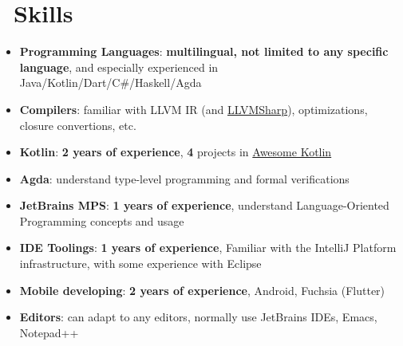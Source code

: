 \documentclass{resume}
\begin{document}
\section{\faCogs\ Skills}
\begin{itemize}[parsep=0.5ex]
  \item \textbf{Programming Languages}:
    \textbf{multilingual, not limited to any specific language},
    and especially experienced in Java/Kotlin/Dart/C\#/Haskell/Agda

  \item \textbf{Compilers}:
    familiar with LLVM IR (and \href{https://github.com/Microsoft/LLVMSharp/} {LLVMSharp}), optimizations, closure convertions, etc.

  \item \textbf{Kotlin}:
    \textbf{2 years of experience},
    \textbf{4} projects in
    \href{https://kotlin.link/?q=ice} {Awesome Kotlin}

  \item \textbf{Agda}:
    understand type-level programming and formal verifications

  \item \textbf{JetBrains MPS}:
    \textbf{1 years of experience},
    understand Language-Oriented Programming concepts and usage

  \item \textbf{IDE Toolings}:
    \textbf{1 years of experience},
    Familiar with the IntelliJ Platform infrastructure,
    with some experience with Eclipse

  \item \textbf{Mobile developing}:
    \textbf{2 years of experience},
    Android, Fuchsia (Flutter)

  \item \textbf{Editors}:
    can adapt to any editors, normally use JetBrains IDEs, Emacs, Notepad++
\end{itemize}

\end{document}
